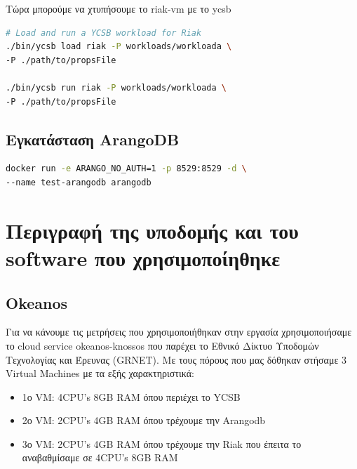 \documentclass[conference]{IEEEtran}
\begin{document}
Τώρα μπορούμε να χτυπήσουμε το riak-vm με το ycsb
\begin{lstlisting}[language=bash
    ,    basicstyle=\small %or \tiny or \footnotesize etc.
]
# Load and run a YCSB workload for Riak
./bin/ycsb load riak -P workloads/workloada \
-P ./path/to/propsFile

./bin/ycsb run riak -P workloads/workloada \
-P ./path/to/propsFile

\end{lstlisting}





\subsection{Εγκατάσταση ArangoDB}

\begin{lstlisting}[language=bash
    ,    basicstyle=\small %or \tiny or \footnotesize etc.
]
docker run -e ARANGO_NO_AUTH=1 -p 8529:8529 -d \
--name test-arangodb arangodb
\end{lstlisting}

\section{Περιγραφή της υποδομής και του software που χρησιμοποίηθηκε}

\subsection{Okeanos}
Για να κάνουμε τις μετρήσεις που χρησιμοποιήθηκαν στην εργασία χρησιμοποιήσαμε το cloud service okeanos-knossos που παρέχει το Εθνικό Δίκτυο Υποδομών Τεχνολογίας και Έρευνας (GRNET). Mε τους πόρους που μας δόθηκαν στήσαμε 3 Virtual Machines με τα εξής χαρακτηριστικά:
\begin{itemize}

\item
1ο VM: 4CPU’s 8GB RAM όπου περιέχει το YCSB
\item
2ο VM: 2CPU’s 4GB RAM όπου τρέχουμε την Arangodb
\item
3ο VM: 2CPU’s 4GB RAM όπου τρέχουμε την Riak  που έπειτα το αναβαθμίσαμε σε 4CPU’s 8GB RAM

\end{itemize}
\end{document}
